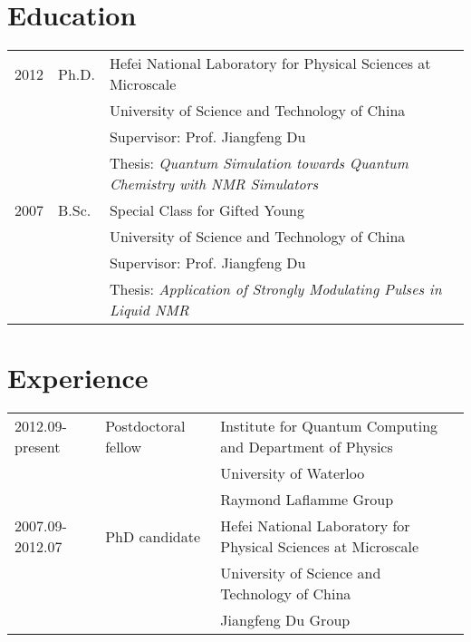\documentclass[a4paper,10pt]{article}
\begin{document}
\maketitle


\section{Education}
\medskip
\begin{tabular}{lll}
2012 & Ph.D. & Hefei National Laboratory for Physical Sciences at Microscale\\
\medskip
&&University of Science and Technology of China\\
&&Supervisor: Prof. Jiangfeng Du\\
\medskip
\medskip
\medskip
&&Thesis: \emph{Quantum Simulation towards Quantum Chemistry with NMR Simulators}\\
2007 & B.Sc. & Special Class for Gifted Young\\
\medskip
&&University of Science and Technology of China\\
&&Supervisor: Prof. Jiangfeng Du\\
&&Thesis: \emph{Application of Strongly Modulating Pulses in Liquid NMR}\\
\end{tabular}

\medskip
\section{Experience}
\medskip
\begin{tabular}{lll}
2012.09-present & Postdoctoral fellow & Institute for Quantum Computing and Department of Physics\\
&&University of Waterloo\\
\medskip
\medskip
&&Raymond Laflamme Group\\
2007.09-2012.07 & PhD candidate & Hefei National Laboratory for Physical Sciences at Microscale\\
&&University of Science and Technology of China\\
&&Jiangfeng Du Group\\
\end{tabular}

\medskip
\end{document}
